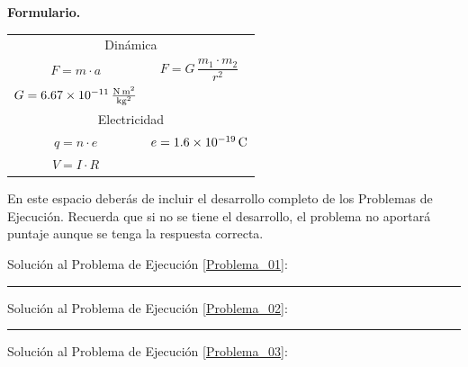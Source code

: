 \documentclass[12pt, letter]{exam}
\begin{document}
\vspace*{1cm}
\textbf{\huge{Formulario.}}
\begin{table}[H]
    \centering
    \setlength{\tabcolsep}{40pt}
    \renewcommand{\arraystretch}{1.5}
    \begin{tabular}{c  c}
        \multicolumn{2}{c}{Dinámica} \\
        $F = m \cdot a$ & $F = G \, \dfrac{m_{1} \cdot m_{2}}{r^{2}}$ \\
        $G = \SI[per-mode=fraction]{6.67d-11}{\newton\square\meter\per\square\kilo\gram}$ &  \\ \hline
        \multicolumn{2}{c}{Electricidad} \\
        $q = n \cdot e$ & $e = \SI{1.6d-19}{\coulomb}$ \\
        $V = I \cdot R$ & \\ 
    \end{tabular}
    \end{table}

\newpage
En este espacio deberás de incluir el desarrollo completo de los Problemas de Ejecución. Recuerda que si no se tiene el desarrollo, el problema no aportará puntaje aunque se tenga la respuesta correcta.

\vspace*{0.5cm}
Solución al Problema de Ejecución \ref{Problema_01}:

\vspace*{6cm}
\rule{0.9\textwidth}{0.3mm}

Solución al Problema de Ejecución \ref{Problema_02}:

\vspace*{6cm}
\rule{0.9\textwidth}{0.3mm}

Solución al Problema de Ejecución \ref{Problema_03}:
\end{document}
